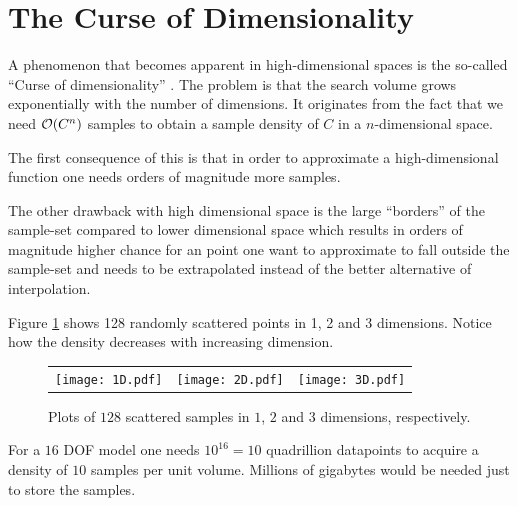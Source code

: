 \section{The Curse of Dimensionality}
A phenomenon that becomes apparent in high-dimensional spaces is the so-called ``Curse of dimensionality'' \cite{EncyclopediaMachineLearning}.
The problem is that the search volume grows exponentially with the number of dimensions. 
It originates from the fact that we need $\mathcal{O}{\left(C^n\right)}$ samples to obtain a sample density of $C$ in a $n$-dimensional space.

The first consequence of this is that in order to approximate a high-dimensional function one needs orders of magnitude more samples.

The other drawback with high dimensional space is the large ``borders'' 
of the sample-set compared to lower dimensional space which results in orders of
magnitude higher chance for an point one want to approximate to fall outside
the sample-set and needs to be extrapolated instead of the better alternative of interpolation.


\begin{example}
  Figure \ref{fig:curse-of-dimensionality} shows 128 randomly scattered points in 1, 2 and 3 dimensions. Notice how the density decreases with increasing dimension.
  \begin{figure}
    \begin{tabular}{rcl}
      \texttt{[image: 1D.pdf]}&
      \texttt{[image: 2D.pdf]}&
      \texttt{[image: 3D.pdf]}
    \end{tabular}
    \caption{Plots of $128$ scattered samples in $1$, $2$ and $3$ dimensions, respectively.}
    \label{fig:curse-of-dimensionality}
  \end{figure}
\end{example}

\begin{example}
  For a $16$ DOF model one needs $10^{16}=10$ quadrillion datapoints to acquire a density of $10$ samples per unit volume. Millions of gigabytes would be needed just to store the samples.
\end{example}

